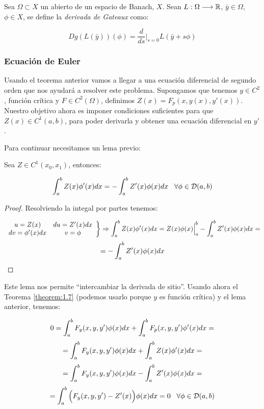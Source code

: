\begin{definition}
\label{gateaux}

Sea $\Omega\subset X$ un abierto de un espacio de Banach, $X$. Sean $L:\Omega\longrightarrow\mathbb{R}$, $\bar{y}\in \Omega$, $\phi\in X$, se define la \textit{derivada de Gateaux} como:

\[
Dg(L(\bar{y}))(\phi)=\frac{d}{ds}\Big|_{s=0}L(\bar{y}+s\phi)
\]

\end{definition}

\subsubsection{Ecuación de Euler}

Usando el teorema anterior vamos a llegar a una ecuación diferencial de segundo orden que nos ayudará a resolver este problema. Supongamos que tenemos $y\in C^2$, función crítica y $F\in C^2(\Omega)$, definimos $Z(x)=F_p(x,y(x),y'(x))$.
Nuestro objetivo ahora es imponer condiciones suficientes para que $Z(x)\in C^1(a,b)$, para poder derivarla y obtener una ecuación diferencial en $y'$.

Para continuar necesitamos un lema previo:

\begin{lemma}
Sea $Z\in C^1(x_0,x_1)$, entonces:

\[
\displaystyle\int_{ a }^{ b } Z(x)\phi'(x)dx=-\displaystyle\int_{ a }^{ b } Z'(x)\phi(x)dx \;\;\; \forall \phi\in\mathcal{D}(a,b)
\]
\end{lemma}

\begin{proof}

Resolviendo la integal por partes tenemos:

\[
\left.\begin{array}{cc}
u=Z(x) & du=Z'(x)dx\\
dv=\phi'(x)dx & v=\phi
\end{array}\right\} \Rightarrow\displaystyle\int_{ a }^{ b } Z(x)\phi'(x)dx=Z(x)\phi(x)\Big|_a^b-\displaystyle\int_{ a }^{ b } Z'(x)\phi(x)dx=
\]
\[
=-\displaystyle\int_{ a }^{ b } Z'(x)\phi(x)dx
\]

\end{proof}

Este lema nos permite \enquote{intercambiar la derivada de sitio}.
Usando ahora el Teorema \ref{theorem:1.7} (podemos usarlo porque $y$ es función crítica) y el lema anterior, tenemos:

\[
0=\displaystyle\int_{ a }^{ b } F_y(x,y, y')\phi(x)dx+\displaystyle\int_{ a }^{ b } F_p(x,y,y')\phi'(x)dx= 
\]
\[
=\displaystyle\int_{ a }^{ b } F_y(x,y, y')\phi(x)dx+\displaystyle\int_{ a }^{ b } Z(x)\phi'(x)dx=
\]
\[
=\displaystyle\int_{ a }^{ b } F_y(x,y, y')\phi(x)dx-\displaystyle\int_{ a }^{ b } Z'(x)\phi(x)dx=
\]
\[
=\displaystyle\int_{ a }^{ b } \Big(F_y(x,y, y')-Z'(x)\Big)\phi(x)dx=0 \;\;\; \forall\phi\in\mathcal{D}(a,b)
\]

